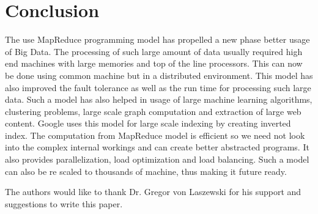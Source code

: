 \documentclass[sigconf]{acmart}
\begin{document}
\section{Conclusion}
The use MapReduce programming model has propelled a new phase better usage of Big Data. The processing of such large amount of data usually required high end machines with large memories and top of the line processors. This can now be done using common machine but in a distributed environment. This model has also improved the fault tolerance as well as the run time for processing such large data. Such a model has also helped in usage of large machine learning algorithms, clustering problems, large scale graph computation and extraction of large web content. Google uses this model for large scale indexing by creating inverted index. The computation from MapReduce model is efficient so we need not look into the complex internal workings and can create better abstracted programs. It also provides parallelization, load optimization and load balancing. Such a model can also be re scaled to thousands of machine, thus making it future ready. 


\begin{acks}

  The authors would like to thank Dr. Gregor von Laszewski for his support and suggestions to write this paper.

\end{acks}


 
\end{document}
